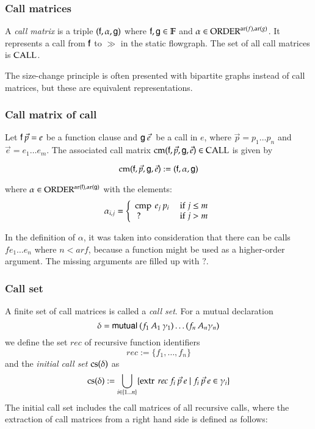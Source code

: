 \newcommand{\call}{\opn{CALL}}
\newcommand{\cm}{\opn{cm}}
\newcommand{\cs}{\opn{cs}}
\newcommand{\complete}{\opn{complete}}

\subsubsection{Call matrices}
A \emph{call matrix} is a triple $(\mathsf{f},\alpha,\mathsf{g})$ where $\mathsf{f},\mathsf{g} \in \mathbb{F}$ and $\alpha \in \operatorname{ORDER}^{\operatorname{ar}(f),\operatorname{ar}(g)}$.
It represents a call from $\mathsf{f}$ to $\gg$ in the static flowgraph. The set of all call matrices is $\call$.

The size-change principle is often presented with bipartite graphs instead of call matrices, but these are
equivalent representations.


\subsubsection{Call matrix of call}
Let $\mathsf{f} \: \vec{p} = e$ be a function clause and $\mathsf{g} \: \vec{e}\:$ be a call in $e$,
where $\vec{p} = p_1 \ldots p_n$ and $\vec{e} = e_1 \ldots e_m$.
The associated call matrix $\cm(\ff,\vec{p},\fg,\vec{e}) \in \call $ is given by 

\[\cm(\ff,\vec{p},\fg,\vec{e}) := (\ff,\alpha,\fg) \]


where $\alpha \in \operatorname{ORDER}^{\operatorname{ar}(\mathsf{f}),\operatorname{ar}(\mathsf{g})} $ with the elements:
\[ 
\alpha_{i,j} = \left\{ \begin{array}{ll}
    \operatorname{cmp} \: e_j \: p_i & \mbox{ if } j \leq m \\
    \: ?  & \mbox{ if } j > m
 \end{array}\right.
\]

    
In the definition of $\alpha$, it was taken into consideration that there can be calls $f e_1 \ldots e_n$ where $n < ar f$, because a function might be used as a higher-order argument. The missing arguments are filled up with $?$. 

\subsubsection{Call set}
A finite set of call matrices is called a \emph{call set}.
For a mutual declaration 
\[ \delta = \mathsf{mutual}\: (f_1 \: A_1 \: \gamma_1) \ldots (f_n \: A_n \gamma_n) \] 
we define the set $rec$ of recursive function identifiers
\[ rec := \{ f_1 , \ldots , f_n \} \]
and the \emph{initial call set} $\cs(\delta)$ as
\[ \cs(\delta) := \bigcup_{i \in \{1 \ldots n\}} \{ \extr \: rec \: f_i \: \vec{p} \: e \mid f_i \: \vec{p} \: e \in \gamma_i  \} \] 
The initial call set includes the call matrices of all recursive calls, where the extraction of call matrices from a right hand side is defined as follows:
